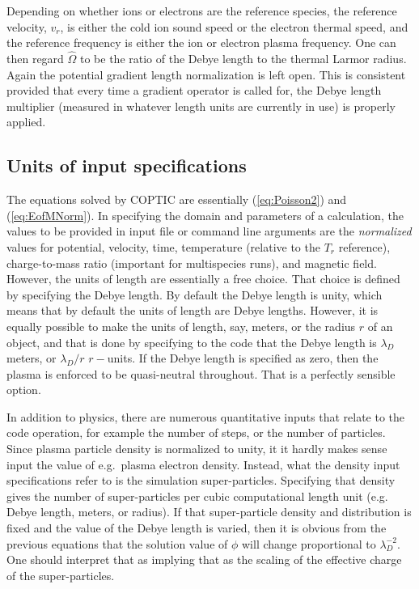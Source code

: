 \documentclass[12pt]{article}
\begin{document}
Depending on whether ions or electrons are the reference species, the
reference velocity, $v_r$, is either the cold ion sound speed or the
electron thermal speed, and the reference frequency is either the ion
or electron plasma frequency. One can then regard $\hat\Omega$ to be
the ratio of the Debye length to the thermal Larmor radius.
Again the potential gradient length
normalization is left open. This is consistent provided that every
time a gradient operator is called for, the Debye length multiplier
(measured in whatever length units are currently in use) is properly
applied. 

\subsection{Units of input specifications}

The equations solved by COPTIC are essentially (\ref{eq:Poisson2}) and
(\ref{eq:EofMNorm}). In specifying the domain and parameters of a
calculation, the values to be provided in input file or command line
arguments are the \emph{normalized} values for potential, velocity,
time, temperature (relative to the $T_r$ reference), charge-to-mass
ratio (important for multispecies runs), and magnetic field. However,
the units of length are essentially a free choice. That choice is
defined by specifying the Debye length. By default the Debye length is
unity, which means that by default the units of length are Debye
lengths. However, it is equally possible to make the units of length,
say, meters, or the radius $r$ of an object, and that is done by
specifying to the code that the Debye length is $\lambda_D$ meters, or
$\lambda_D/r$ $r-$units. If the Debye length is specified as zero, then
the plasma is enforced to be quasi-neutral throughout. That is a
perfectly sensible option.

In addition to physics, there are numerous quantitative inputs that
relate to the code operation, for example the number of steps, or the
number of particles. Since plasma particle density is normalized to
unity, it it hardly makes sense input the value of e.g.\ plasma electron
density. Instead, what the density input specifications refer to is
the simulation super-particles. Specifying that density gives the
number of super-particles per cubic computational length unit
(e.g. Debye length, meters, or radius). If that super-particle density
and distribution is fixed and the value of the Debye length is varied,
then it is obvious from the previous equations that the solution value
of $\phi$ will change proportional to $\lambda_D^{-2}$. One should
interpret that as implying that as the scaling of the effective charge
of the super-particles. 
\end{document}
